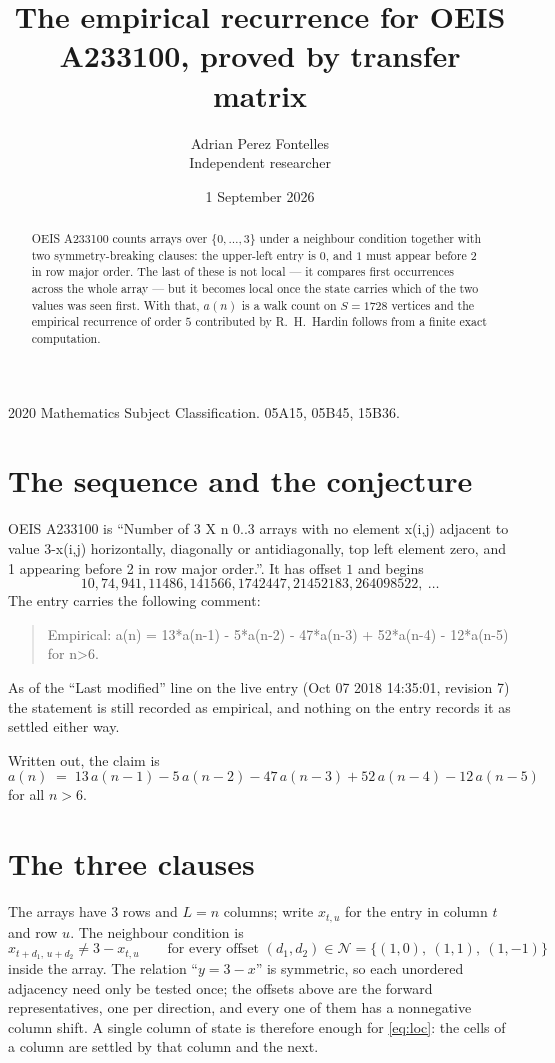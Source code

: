 \documentclass[11pt,a4paper]{article}
\title{The empirical recurrence for OEIS A233100, proved by transfer matrix}
\author{Adrian Perez Fontelles\\ \small Independent researcher}
\date{1 September 2026}
\theoremstyle{plain}
\theoremstyle{definition}
\begin{document}
\maketitle

\begin{abstract}
OEIS A233100 counts arrays over $\{0,\dots,3\}$ under a neighbour condition together with
two symmetry-breaking clauses: the upper-left entry is $0$, and $1$ must appear before
$2$ in row major order. The last of these is not local --- it compares first occurrences
across the whole array --- but it becomes local once the state carries which of the two values
was seen first. With that, $a(n)$ is a walk count on $S=1728$ vertices and the empirical
recurrence of order $5$ contributed by R.~H.~Hardin follows from a finite exact
computation.
\end{abstract}

\noindent\small 2020 Mathematics Subject Classification. 05A15, 05B45, 15B36.\normalsize

\section{The sequence and the conjecture}

OEIS A233100 is ``Number of 3 X n 0..3 arrays with no element x(i,j) adjacent to value 3-x(i,j) horizontally, diagonally or antidiagonally, top left element zero, and 1 appearing before 2 in row major order.''. It has offset $1$ and begins
\[
10, 74, 941, 11486, 141566, 1742447, 21452183, 264098522,\ \dots
\]
The entry carries the following comment:
\begin{quote}\small
Empirical: a(n) = 13*a(n-1) - 5*a(n-2) - 47*a(n-3) + 52*a(n-4) - 12*a(n-5) for n>6.
\end{quote}
As of the ``Last modified'' line on the live entry (Oct 07 2018 14:35:01, revision 7) the statement is
still recorded as empirical, and nothing on the entry records it as settled either way.

Written out, the claim is
\begin{equation}\label{eq:conj}
a(n)\;=\;13\,a(n-1) - 5\,a(n-2) - 47\,a(n-3) + 52\,a(n-4) - 12\,a(n-5)
\end{equation}
for all $n>6$.

\section{The three clauses}

The arrays have $3$ rows and $L=n$ columns; write $x_{t,u}$ for the entry in
column $t$ and row $u$. The neighbour condition is
\begin{equation}\label{eq:loc}
x_{t+d_1,\,u+d_2}\ne 3-x_{t,u}\qquad\text{for every offset }(d_1,d_2)\in\mathcal N=\{(1,0),\ (1,1),\ (1,-1)\}
\end{equation}
inside the array. The relation ``$y=3-x$'' is symmetric, so each unordered adjacency need
only be tested once; the offsets above are the forward representatives, one per direction,
and every one of them has a nonnegative column shift. A single column of state is therefore
enough for \eqref{eq:loc}: the cells of a column are settled by that column and the next.
\end{document}
